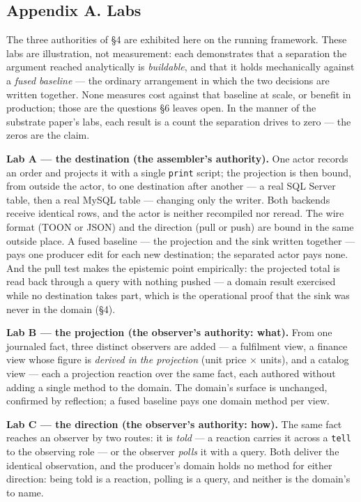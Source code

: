 \documentclass[
]{article}
\newcounter{none} %
\begin{document}
\subsection{Appendix A. Labs}\label{appendix-a.-labs}

The three authorities of §4 are exhibited here on the running framework.
These labs are illustration, not measurement: each demonstrates that a
separation the argument reached analytically is \emph{buildable}, and
that it holds mechanically against a \emph{fused baseline} --- the
ordinary arrangement in which the two decisions are written together.
None measures cost against that baseline at scale, or benefit in
production; those are the questions §6 leaves open. In the manner of the
substrate paper's labs, each result is a count the separation drives to
zero --- the zeros are the claim.

\textbf{Lab A --- the destination (the assembler's authority).} One
actor records an order and projects it with a single \texttt{print}
script; the projection is then bound, from outside the actor, to one
destination after another --- a real SQL Server table, then a real MySQL
table --- changing only the writer. Both backends receive identical
rows, and the actor is neither recompiled nor reread. The wire format
(TOON or JSON) and the direction (pull or push) are bound in the same
outside place. A fused baseline --- the projection and the sink written
together --- pays one producer edit for each new destination; the
separated actor pays none. And the pull test makes the epistemic point
empirically: the projected total is read back through a query with
nothing pushed --- a domain result exercised while no destination takes
part, which is the operational proof that the sink was never in the
domain (§4).

\textbf{Lab B --- the projection (the observer's authority: what).} From
one journaled fact, three distinct observers are added --- a fulfilment
view, a finance view whose figure is \emph{derived in the projection}
(unit price × units), and a catalog view --- each a projection reaction
over the same fact, each authored without adding a single method to the
domain. The domain's surface is unchanged, confirmed by reflection; a
fused baseline pays one domain method per view.

\textbf{Lab C --- the direction (the observer's authority: how).} The
same fact reaches an observer by two routes: it is \emph{told} --- a
reaction carries it across a \texttt{tell} to the observing role --- or
the observer \emph{polls} it with a query. Both deliver the identical
observation, and the producer's domain holds no method for either
direction: being told is a reaction, polling is a query, and neither is
the domain's to name.
\end{document}
